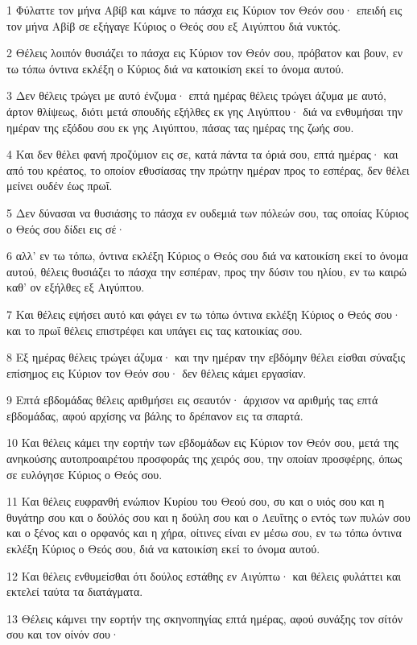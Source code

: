 \par 1 Φύλαττε τον μήνα Αβίβ και κάμνε το πάσχα εις Κύριον τον Θεόν σου· επειδή εις τον μήνα Αβίβ σε εξήγαγε Κύριος ο Θεός σου εξ Αιγύπτου διά νυκτός.
\par 2 Θέλεις λοιπόν θυσιάζει το πάσχα εις Κύριον τον Θεόν σου, πρόβατον και βουν, εν τω τόπω όντινα εκλέξη ο Κύριος διά να κατοικίση εκεί το όνομα αυτού.
\par 3 Δεν θέλεις τρώγει με αυτό ένζυμα· επτά ημέρας θέλεις τρώγει άζυμα με αυτό, άρτον θλίψεως, διότι μετά σπουδής εξήλθες εκ γης Αιγύπτου· διά να ενθυμήσαι την ημέραν της εξόδου σου εκ γης Αιγύπτου, πάσας τας ημέρας της ζωής σου.
\par 4 Και δεν θέλει φανή προζύμιον εις σε, κατά πάντα τα όριά σου, επτά ημέρας· και από του κρέατος, το οποίον εθυσίασας την πρώτην ημέραν προς το εσπέρας, δεν θέλει μείνει ουδέν έως πρωΐ.
\par 5 Δεν δύνασαι να θυσιάσης το πάσχα εν ουδεμιά των πόλεών σου, τας οποίας Κύριος ο Θεός σου δίδει εις σέ·
\par 6 αλλ' εν τω τόπω, όντινα εκλέξη Κύριος ο Θεός σου διά να κατοικίση εκεί το όνομα αυτού, θέλεις θυσιάζει το πάσχα την εσπέραν, προς την δύσιν του ηλίου, εν τω καιρώ καθ' ον εξήλθες εξ Αιγύπτου.
\par 7 Και θέλεις εψήσει αυτό και φάγει εν τω τόπω όντινα εκλέξη Κύριος ο Θεός σου· και το πρωΐ θέλεις επιστρέφει και υπάγει εις τας κατοικίας σου.
\par 8 Εξ ημέρας θέλεις τρώγει άζυμα· και την ημέραν την εβδόμην θέλει είσθαι σύναξις επίσημος εις Κύριον τον Θεόν σου· δεν θέλεις κάμει εργασίαν.
\par 9 Επτά εβδομάδας θέλεις αριθμήσει εις σεαυτόν· άρχισον να αριθμής τας επτά εβδομάδας, αφού αρχίσης να βάλης το δρέπανον εις τα σπαρτά.
\par 10 Και θέλεις κάμει την εορτήν των εβδομάδων εις Κύριον τον Θεόν σου, μετά της ανηκούσης αυτοπροαιρέτου προσφοράς της χειρός σου, την οποίαν προσφέρης, όπως σε ευλόγησε Κύριος ο Θεός σου.
\par 11 Και θέλεις ευφρανθή ενώπιον Κυρίου του Θεού σου, συ και ο υιός σου και η θυγάτηρ σου και ο δούλός σου και η δούλη σου και ο Λευΐτης ο εντός των πυλών σου και ο ξένος και ο ορφανός και η χήρα, οίτινες είναι εν μέσω σου, εν τω τόπω όντινα εκλέξη Κύριος ο Θεός σου, διά να κατοικίση εκεί το όνομα αυτού.
\par 12 Και θέλεις ενθυμείσθαι ότι δούλος εστάθης εν Αιγύπτω· και θέλεις φυλάττει και εκτελεί ταύτα τα διατάγματα.
\par 13 Θέλεις κάμνει την εορτήν της σκηνοπηγίας επτά ημέρας, αφού συνάξης τον σίτόν σου και τον οίνόν σου·

